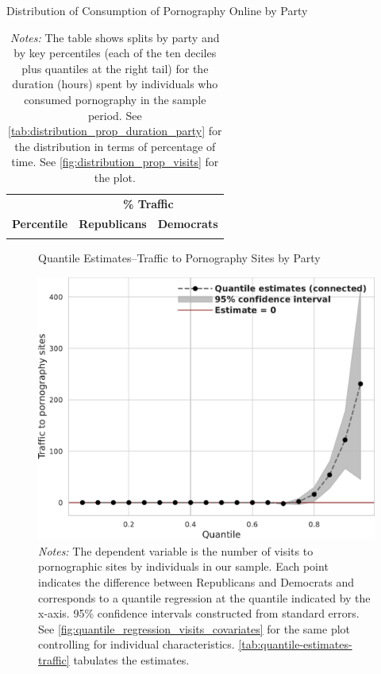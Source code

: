 \documentclass[12pt, letterpaper]{article}
\begin{document}
\begin{table}[ht] \centering \small \setlength\tabcolsep{10 pt}
	\caption{Distribution of Consumption of Pornography Online by Party}
	\label{tab:distribution_prop_visits_party}
	\begin{adjustbox}{max width=\textwidth}
		\begin{tabular}{crr}
			\toprule
			\multicolumn{1}{l}{\textbf{}}&\multicolumn{2}{c}{\textbf{\% Traffic}}\\
			\cmidrule(l){2-3}
			\multicolumn{1}{l}{\textbf{Percentile}}&\multicolumn{1}{c}{\textbf{Republicans}}&\multicolumn{1}{c}{\textbf{Democrats}}\\
			\midrule
            \\
			\bottomrule
		\end{tabular}
	\end{adjustbox}
	\caption*{\footnotesize \emph{Notes:} 
		The table shows splits by party and by key percentiles (each of the ten deciles plus quantiles at the right tail) for the duration (hours) spent by individuals who consumed pornography in the sample period. 
		See \cref{tab:distribution_prop_duration_party} for the distribution in terms of percentage of time. 
		See \cref{fig:distribution_prop_visits} for the plot.
	}
\end{table}

\FloatBarrier
\begin{figure}
	\centering
	\caption{Quantile Estimates--Traffic to Pornography Sites by Party}
	\includegraphics[width=.55\linewidth]{figs/quantile_reg_visits_adult.pdf}
	\caption*{\footnotesize \emph{Notes:} 
		The dependent variable is the number of visits to pornographic sites by individuals in our sample.
		Each point indicates the difference between Republicans and Democrats and corresponds to a quantile regression at the quantile indicated by the x-axis.
		95\% confidence intervals constructed from standard errors.
		See \cref{fig:quantile_regression_visits_covariates} for the same plot controlling for individual characteristics.
            \cref{tab:quantile-estimates-traffic} tabulates the estimates.
	}
	\label{fig:quantile_regression_visits}
\end{figure}
\end{document}
